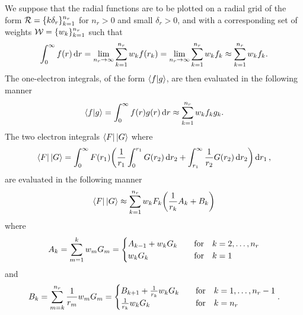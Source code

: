 \documentclass{article}
\begin{document}
We suppose that the radial functions are to be plotted on a radial grid of the
form $\mathcal{R} = \lrset{k \delta_{r}}_{k = 1}^{n_{r}}$ for
$n_{r} > 0$ and small $\delta_{r} > 0$, and with a corresponding set of weights
$\mathcal{W} = \lrset{w_{k}}_{k = 1}^{n_{r}}$ such that
\begin{equation*}
  \int_{0}^{\infty}
  {
    f\lr{r}
  }
  \dd{r}
  =
  \lim_{n_{r} \to \infty}
  \sum_{k = 1}^{n_{r}}
  {
    w_{k}
    f\lr{r_{k}}
  }
  =
  \lim_{n_{r} \to \infty}
  \sum_{k = 1}^{n_{r}}
  {
    w_{k}
    f_{k}
  }
  \approx
  \sum_{k = 1}^{n_{r}}
  {
    w_{k}
    f_{k}
  }
  .
\end{equation*}
The one-electron integrals, of the form $\braket{f}{g}$, are then
evaluated in the following manner
\begin{equation*}
  \braket{f}{g}
  =
  \int_{0}^{\infty}
  {
    f\lr{r}
    g\lr{r}
  }
  \dd{r}
  \approx
  \sum_{k = 1}^{n_{r}}
  {
    w_{k}
    f_{k}
    g_{k}
  }
  .
\end{equation*}
The two electron integrals $\bra{F} {} \ket{G}$ where
\begin{equation*}
  \bra{F} {} \ket{G}
  =
  \int_{0}^{\infty}
  {
    F\lr{r_{1}}
    \lr[\bigg]
    {
      \dfrac{1}{r_{1}}
      \int_{0}^{r_{1}}
      {
        G\lr{r_{2}}
      }
      \dd{r_{2}}
      +
      \int_{r_{1}}^{\infty}
      {
        \dfrac{1}{r_{2}}
        G\lr{r_{2}}
      }
      \dd{r_{2}}
    }
  }
  \dd{r_{1}}
  ,
\end{equation*}
are evaluated in the following manner
\begin{equation*}
  \bra{F} {} \ket{G}
  \approx
  \sum_{k = 1}^{n_{r}}
  {
    w_{k}
    F_{k}
    \lr[\bigg]
    {
      \dfrac{1}{r_{k}}
      A_{k}
      +
      B_{k}
    }
  }
\end{equation*}
where
\begin{equation*}
  A_{k}
  =
  \sum_{m = 1}^{k}
  {
    w_{m}
    G_{m}
  }
  =
  \begin{cases}
    A_{k - 1}
    +
    w_{k}
    G_{k}
    &
    \qq{for}
    k = 2, \dotsc, n_{r}
    \\
    w_{k}
    G_{k}
    &
    \qq{for}
    k = 1
  \end{cases}
\end{equation*}
and
\begin{equation*}
  B_{k}
  =
  \sum_{m = k}^{n_{r}}
  {
    \dfrac{1}{r_{m}}
    w_{m}
    G_{m}
  }
  =
  \begin{cases}
    B_{k + 1}
    +
    \tfrac{1}{r_{k}}
    w_{k}
    G_{k}
    &
    \qq{for}
    k = 1, \dotsc, n_{r} - 1
    \\
    \tfrac{1}{r_{k}}
    w_{k}
    G_{k}
    &
    \qq{for}
    k = n_{r}
  \end{cases}
  .
\end{equation*}
\end{document}
